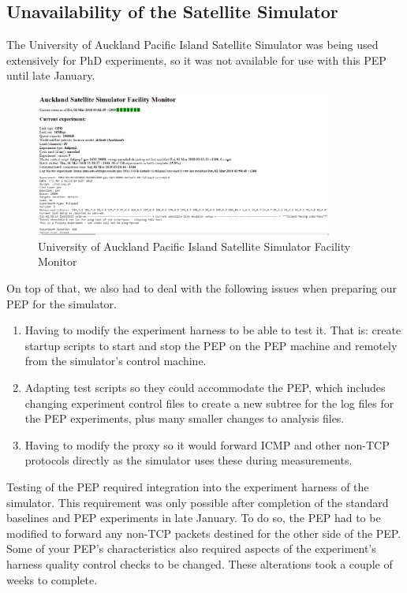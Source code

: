 \documentclass{uathesis}
\begin{document}
\begin{appendices}
\subsection{Unavailability of the Satellite Simulator}

The University of Auckland Pacific Island Satellite Simulator was being used extensively for PhD experiments, so it was not available for use with this PEP until late January. 

\begin{figure}[h!]
    \centering
    \includegraphics[width=0.87\textwidth]{experiment.PNG}
    \caption{University of Auckland Pacific Island Satellite Simulator Facility Monitor}
    \label{fig: experiment} 
\end{figure}

On top of that, we also had to deal with the following issues when preparing our PEP for the simulator.\\
\begin{enumerate}
\item Having to modify the experiment harness to be able to test it. That is: create startup scripts to start and stop the PEP on the PEP machine and remotely from the simulator's control machine. 
\item Adapting test scripts so they could accommodate the PEP, which includes changing experiment control files to create a new subtree for the log files for the PEP experiments, plus many smaller changes to analysis files.
\item Having to modify the proxy so it would forward ICMP and other non-TCP protocols directly as the simulator uses these during measurements. \\
\end{enumerate}

Testing of the PEP required integration into the experiment harness of the simulator. This requirement was only possible after completion of the standard baselines and PEP experiments in late January. To do so, the PEP had to be modified to forward any non-TCP packets destined for the other side of the PEP. Some of your PEP's characteristics also required aspects of the experiment's harness quality control checks to be changed. These alterations took a couple of weeks to complete. \\


\end{appendices}
\end{document}
